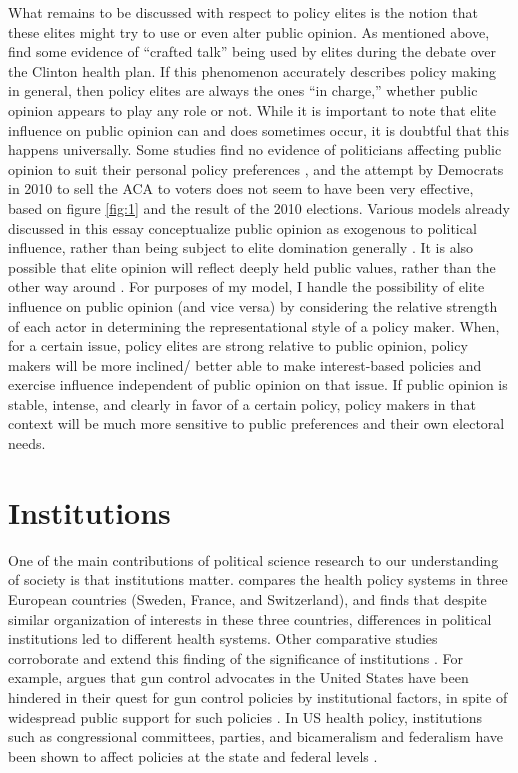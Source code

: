 What remains to be discussed with respect to policy elites is the notion that these elites might try to use or even alter public opinion. As mentioned above, \citet{Jacobs2000} find some evidence of ``crafted talk'' being used by elites during the debate over the Clinton health plan. If this phenomenon accurately describes policy making in general, then policy elites are always the ones ``in charge,'' whether public opinion appears to play any role or not. While it is important to note that elite influence on public opinion can \citep[see][ch. 12]{Zaller1992a} and does sometimes occur, it is doubtful that this happens universally. Some studies find no evidence of politicians affecting public opinion to suit their personal policy preferences \citep{Soroka2010}, and the attempt by Democrats in 2010 to sell the ACA to voters \citep{Bradley2014} does not seem to have been very effective,  based on figure \ref{fig:1} and the result of the 2010 elections. Various models already discussed in this essay conceptualize public opinion as exogenous to political influence, rather than being subject to elite domination generally \citep{Fenno1977,Mayhew1974,Kingdon1995}. It is also possible that elite opinion will reflect deeply held public values, rather than the other way around \citep{Zaller1992a,Lindblom1965}. For purposes of my model, I handle the possibility of elite influence on public opinion (and vice versa) by considering the relative strength of each actor in determining the representational style of a policy maker. When, for a certain issue, policy elites are strong relative to public opinion, policy makers will be more inclined/ better able to make interest-based policies and exercise influence independent of public opinion on that issue. If public opinion is stable, intense, and clearly in favor of a certain policy, policy makers in that context will be much more sensitive to public preferences and their own electoral needs.

\section*{Institutions}

One of the main contributions of political science research to our understanding of society is that institutions matter. \citet{Immergut1992} compares the health policy systems in three European countries (Sweden, France, and Switzerland), and finds that despite similar organization of interests in these three countries, differences in political institutions led to different health systems. Other comparative studies corroborate and extend this finding of the significance of institutions \citep{Hacker2004,Gray1998}. For example, \citet{Goss2004} argues that gun control advocates in the United States have been hindered in their quest for gun control policies by institutional factors, in spite of widespread public support for such policies \citep{Smith2001,Wozniak2015}. In US health policy, institutions such as congressional committees, parties, and bicameralism \citep{Volden2011,Smith2002} and federalism \citep{Ogden2012,Haeder2012} have been shown to affect policies at the state and federal levels \citep[see also][]{Morone1992}.

